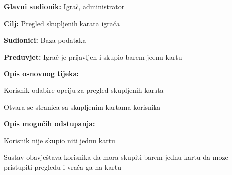 					\noindent {}
					\begin{packed_item}
						
						\item \textbf{Glavni sudionik: }Igrač, administrator
						\item  \textbf{Cilj:} Pregled skupljenih karata igrača
						\item  \textbf{Sudionici:} Baza podataka
						\item  \textbf{Preduvjet:} Igrač je prijavljen i skupio barem jednu kartu
						\item  \textbf{Opis osnovnog tijeka:}
						
						\item[] \begin{packed_enum}
							
							\item Korisnik odabire opciju za pregled skupljenih karata
							\item Otvara se stranica sa skupljenim kartama korisnika
						\end{packed_enum}
						
						\item  \textbf{Opis mogućih odstupanja:}
						
						\item[] \begin{packed_item}
							
							\item[2.a] Korisnik nije skupio niti jednu kartu
							\item[] \begin{packed_enum}
								
								\item Sustav obavještava korisnika da mora skupiti barem jednu kartu da moze pristupiti pregledu i vraća ga na kartu
								
							\end{packed_enum}
						\end{packed_item}
					\end{packed_item}
				
